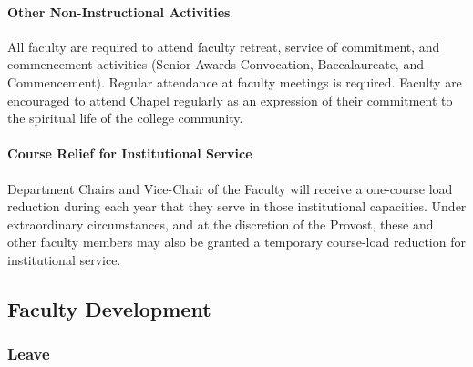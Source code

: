 \documentclass[letterpaper, 11pt]{article}
\begin{document}
			\paragraph{Other Non-Instructional Activities}
				All faculty are required to attend faculty retreat, service of commitment, and commencement activities (Senior Awards Convocation, Baccalaureate, and Commencement).  Regular attendance at faculty meetings is required.  Faculty are encouraged to attend Chapel regularly as an expression of their commitment to the spiritual life of the college community.
			\paragraph{Course Relief for Institutional Service}
				Department Chairs and Vice-Chair of the Faculty will receive a one-course load reduction during each year that they serve in those institutional capacities.  Under extraordinary circumstances, and at the discretion of the Provost, these and other faculty members may also be granted a temporary course-load reduction for institutional service.
	\subsection{Faculty Development}
		\subsubsection{Leave}
\end{document}
